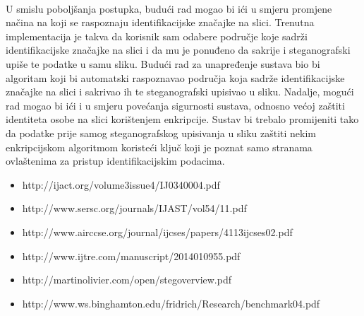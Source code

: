 \documentclass[times, utf8, seminar]{fer}
\begin{document}
\paragraph{}
U smislu poboljšanja postupka, budući rad mogao bi ići u smjeru promjene načina na koji se raspoznaju identifikacijske značajke na slici. Trenutna implementacija je takva da korisnik sam odabere područje koje sadrži identifikacijske značajke na slici i da mu je ponuđeno da sakrije i steganografski upiše te podatke u samu sliku. Budući rad za unapređenje sustava bio bi algoritam koji bi automatski raspoznavao područja koja sadrže identifikacijske značajke na slici i sakrivao ih te steganografski upisivao u sliku. Nadalje, mogući rad mogao bi ići i u smjeru povećanja sigurnosti sustava, odnosno većoj zaštiti identiteta osobe na slici korištenjem enkripcije. Sustav bi trebalo promijeniti tako da podatke prije samog steganografskog upisivanja u sliku zaštiti nekim enkripcijskom algoritmom koristeći ključ koji je poznat samo stranama ovlaštenima za pristup identifikacijskim podacima.


\begin{itemize}
  \item http://ijact.org/volume3issue4/IJ0340004.pdf
  \item http://www.sersc.org/journals/IJAST/vol54/11.pdf
  \item http://www.airccse.org/journal/ijcses/papers/4113ijcses02.pdf
  \item http://www.ijtre.com/manuscript/2014010955.pdf
  \item http://martinolivier.com/open/stegoverview.pdf
  \item http://www.ws.binghamton.edu/fridrich/Research/benchmark04.pdf
\end{itemize}
\end{document}
